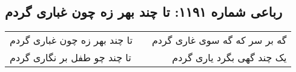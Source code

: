 \begin{center}
\section*{رباعی شماره ۱۱۹۱: تا چند بهر زه چون غباری گردم}
\label{sec:1191}
\begin{longtable}{l p{0.5cm} r}
تا چند بهر زه چون غباری گردم
&&
گه بر سر که گه سوی غاری گردم
\\
تا چند چو طفل بر نگاری گردم
&&
یک چند گهی بگرد یاری گردم
\\
\end{longtable}
\end{center}
